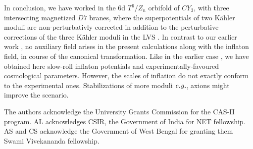 \documentclass[doublecol]{epl2}
\begin{document}
\par In conclusion, we have worked in the 6d $T^6/Z_n$ orbifold of $CY_3$, with three intersecting magnetized $D7$ branes, where the superpotentials of two K\"ahler moduli are non-perturbativly corrected in addition to the perturbative corrections \cite{Antoniadis:2019rkh,Becker:2002nn} of the three K\"ahler moduli in the LVS \cite{Balasubramanian:2005zx}. In contrast to our earlier work \cite{Let:2022fmu}, no auxiliary field arises in the present calculations along with the inflaton field, in course of the canonical transformation. Like in the earlier case \cite{Let:2022fmu}, we have obtained here slow-roll inflaton potentials and experimentally-favoured cosmological parameters. However, the scales of inflation do not exactly conform to the experimental ones. Stabilizations of more moduli $\it{e.g.}$, axions might improve the scenario.












\acknowledgments
The authors acknowledge the University Grants Commission for the CAS-II program. AL acknowledges CSIR, the Government of India for NET fellowship. AS and CS acknowledge the Government of West Bengal for granting them Swami Vivekananda fellowship. 




\end{document}
